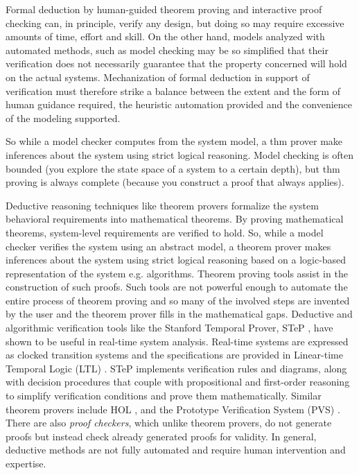 Formal deduction by human-guided theorem proving and interactive proof checking
can, in principle, verify any design, but doing so may require excessive amounts
of time, effort and skill. On the other hand, models analyzed with automated
methods, such as model checking may be so simplified that their verification
does not necessarily guarantee that the property concerned will hold on the
actual systems. Mechanization of formal deduction in support of verification
must therefore strike a balance between the extent and the form of human
guidance required, the heuristic automation provided and the convenience of the
modeling supported.

So while a model checker computes from the system model, a thm prover make
inferences about the system using strict logical reasoning. Model checking is
often bounded (you explore the state space of a system to a certain depth), but
thm proving is always complete (because you construct a proof that always
applies).

Deductive reasoning techniques like theorem provers formalize the system
behavioral requirements into mathematical theorems. By proving mathematical
theorems, system-level requirements are verified to hold. So, while a model
checker verifies the system using an abstract model, a theorem prover makes
inferences about the system using strict logical reasoning based on a
logic-based representation of the system e.g. algorithms. Theorem proving tools
assist in the construction of such proofs. Such tools are not powerful enough to
automate the entire process of theorem proving and so many of the involved steps
are invented by the user and the theorem prover fills in the mathematical gaps.
Deductive and algorithmic verification tools like the Stanford Temporal Prover,
STeP \cite{bjorner2001deductive}, have shown to be useful in real-time system
analysis. Real-time systems are expressed as clocked transition systems and the
specifications are provided in Linear-time Temporal Logic (LTL)
\cite{gabbay1994temporal}. STeP implements verification rules and diagrams,
along with decision procedures that couple with propositional and first-order
reasoning to simplify verification conditions and prove them mathematically.
Similar theorem provers include HOL \cite{gordon1993introduction}, and the
Prototype Verification System (PVS) \cite{owre1992pvs}. There are also
\emph{proof checkers}, which unlike theorem provers, do not generate proofs but
instead check already generated proofs for validity. In general, deductive
methods are not fully automated and require human intervention and expertise.

